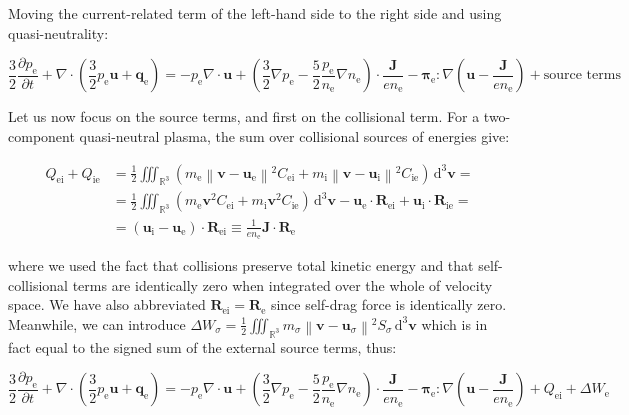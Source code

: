Moving the current-related term of the left-hand side to the right side and using quasi-neutrality:

\begin{equation*}
    \frac{3}{2}\frac{\partial p_{\mathrm{e}}}{\partial t}+\nabla\cdot \left(\frac{3}{2}p_{\mathrm{e}}\mathbf{u}+\mathbf{q}_{\mathrm{e}}\right)=-p_{\mathrm{e}}\nabla\cdot \mathbf{u}+\left(\frac{3}{2}\nabla p_{\mathrm{e}}-\frac{5}{2}\frac{p_{\mathrm{e}}}{n_{\mathrm{e}}}\nabla n_{\mathrm{e}}\right)\cdot \frac{\mathbf{J}}{en_{\mathrm{e}}}-\boldsymbol{\pi}_{\mathrm{e}}:\nabla \left(\mathbf{u}-\frac{\mathbf{J}}{en_{\mathrm{e}}}\right)+\text{source terms}
\end{equation*}

Let us now focus on the source terms, and first on the collisional term. For a two-component quasi-neutral plasma, the sum over collisional sources of energies give:

\begin{align*}
    Q_{\mathrm{ei}}+Q_{\mathrm{ie}}&=\frac{1}{2}\iiint_{\mathbb{R}^3}\left(m_{\mathrm{e}}\left\|\mathbf{v}-\mathbf{u}_{\mathrm{e}}\right\|^2 C_{\mathrm{ei}}+m_{\mathrm{i}}\left\|\mathbf{v}-\mathbf{u}_{\mathrm{i}}\right\|^2C_{\mathrm{ie}}\right)\,\mathrm{d}^3 \mathbf{v}=\\
    &=\frac{1}{2}\iiint_{\mathbb{R}^3}\left(m_{\mathrm{e}}\mathbf{v}^2C_{\mathrm{ei}}+m_{\mathrm{i}}\mathbf{v}^2 C_{\mathrm{ie}}\right)\,\mathrm{d}^3 \mathbf{v}-\mathbf{u}_{\mathrm{e}}\cdot \mathbf{R}_{\mathrm{ei}}+\mathbf{u}_{\mathrm{i}}\cdot \mathbf{R}_{\mathrm{ie}}=\\
    &=\left(\mathbf{u}_{\mathrm{i}}-\mathbf{u}_{\mathrm{e}}\right)\cdot \mathbf{R}_{\mathrm{ei}}\equiv \frac{1}{en_{\mathrm{e}}}\mathbf{J}\cdot \mathbf{R}_{\mathrm{e}}
\end{align*}

where we used the fact that collisions preserve total kinetic energy and that self-collisional terms are identically zero when integrated over the whole of velocity space. We have also abbreviated $\mathbf{R}_{\mathrm{ei}}=\mathbf{R}_{\mathrm{e}}$ since self-drag force is identically zero. Meanwhile, we can introduce $\Delta W_\sigma = \frac{1}{2}\iiint_{\mathbb{R}^3}m_\sigma \left\|\mathbf{v}-\mathbf{u}_\sigma\right\|^2 S_\sigma\,\mathrm{d}^3 \mathbf{v}$ which is in fact equal to the signed sum of the external source terms, thus:

\begin{equation}
    \frac{3}{2}\frac{\partial p_{\mathrm{e}}}{\partial t}+\nabla\cdot \left(\frac{3}{2}p_{\mathrm{e}}\mathbf{u}+\mathbf{q}_{\mathrm{e}}\right)=-p_{\mathrm{e}}\nabla\cdot \mathbf{u}+\left(\frac{3}{2}\nabla p_{\mathrm{e}}-\frac{5}{2}\frac{p_{\mathrm{e}}}{n_{\mathrm{e}}}\nabla n_{\mathrm{e}}\right)\cdot \frac{\mathbf{J}}{en_{\mathrm{e}}}-\boldsymbol{\pi}_{\mathrm{e}}:\nabla \left(\mathbf{u}-\frac{\mathbf{J}}{en_{\mathrm{e}}}\right)+Q_{\mathrm{ei}}+\Delta W_{\mathrm{e}}
\end{equation}

